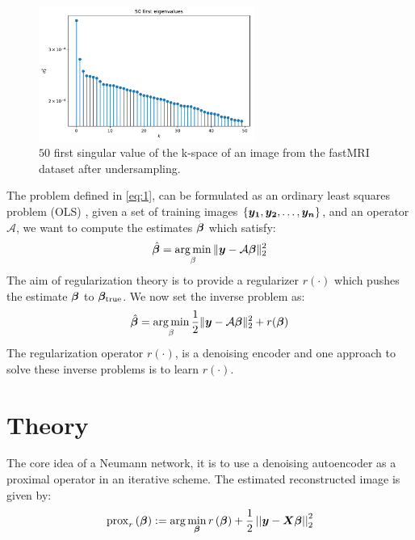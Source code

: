 \documentclass{article}
\begin{document}
	\begin{figure}[H]
		\centering
		\captionsetup{justification=centering}
		\includegraphics[width=200pt]{variance_plot_log.pdf}
		\caption{$50$ first singular value of the k-space of an image from the fastMRI dataset after undersampling.}
	\end{figure}
The problem defined in \eqref{eq:1}, can be formulated as an ordinary least squares problem (OLS) , given a set of training images $\{\bm{y_1}, \bm{y_2}, \ldots, \bm{y_n}\}$, and an operator $\mathcal{A}$, we want to compute the estimates 
$\bm{\beta}$ which satisfy:
$$
\hat{\bm{\beta}}  =  \operatorname*{arg\,min}_{\beta} \| \bm{y} -\mathcal{A} \bm{\beta} \|_2^2
$$
The aim of regularization theory is to provide a regularizer $r(\cdot)$ which pushes the estimate $\bm{\beta}$ to $\bm{\beta}_{\text{true}}$. We now set the inverse problem as:
$$
\hat{\bm{\beta}}  =  \operatorname*{arg\,min}_{\beta} \frac{1}{2} \| \bm{y} -\mathcal{A} \bm{\beta} \|_2^2 + r(\bm{\beta})
$$
The regularization operator $r(\cdot)$, is a denoising encoder and one approach to solve these inverse problems is to learn $r(\cdot)$. 
 
\section{Theory}
\label{Theory}

The core idea of a Neumann network, it is to use a denoising autoencoder as a proximal operator in an iterative scheme.
The estimated reconstructed image is given by:
\begin{equation}
\operatorname{prox}_{r}\left( \bm{\beta} \right) := \arg \min_{\bm{\beta}} r\left( \bm{\beta} \right)+ \frac{1}{2} \left|\left| \bm{y}-\bm{X}\bm{\beta} \right|\right| _{2}^2  \label{eq:2}
\end{equation}
\end{document}
